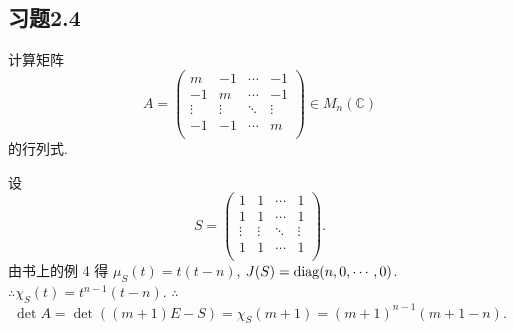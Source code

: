 \documentclass[color=black,device=normal,lang=cn,mode=geye]{elegantnote}
\begin{document}
\subsection{习题2.4}
\begin{exercise}%
    计算矩阵
    \[A=\begin{pmatrix}
        m & -1 & \cdots & -1 \\
        -1 & m & \cdots & -1 \\
        \vdots & \vdots & \ddots & \vdots \\
        -1 & -1 & \cdots & m \\
    \end{pmatrix}\in M_n(\mathbb{C})\]
    的行列式.
\end{exercise}
\begin{solution}
    设
    \[S=\begin{pmatrix}
        1 & 1 & \cdots & 1 \\
        1 & 1 & \cdots & 1 \\
        \vdots & \vdots & \ddots & \vdots \\
        1 & 1 & \cdots & 1 \\
    \end{pmatrix}.\]
    由书上的例 4 得 $\mu_S(t)=t(t-n)$, $J(S)=\operatorname{diag}(n,0,\cdots,0)$. $\therefore\chi_S(t)=t^{n-1}(t-n)$. $\therefore$
    \[\det A=\det((m+1)E-S)=\chi_S(m+1)=(m+1)^{n-1}(m+1-n).\]
\end{solution}
\end{document}
